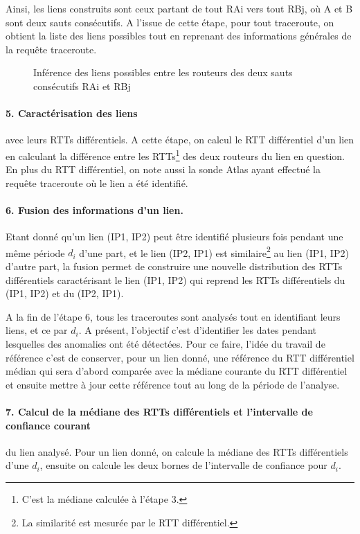 Ainsi, les liens  construits sont ceux partant de tout RAi vers tout RBj, où A et B sont deux sauts consécutifs. A l'issue de cette étape, pour tout traceroute, on obtient la liste des liens possibles tout en reprenant des informations générales de la requête traceroute.
\begin{figure}[H]
	\centering
	\captionsetup{justification=centering}
	
	\caption{Inférence des liens possibles entre les routeurs des deux sauts consécutifs RAi et RBj}
	\label{fig:link-inference}
\end{figure}
\paragraph{5. Caractérisation des liens} avec leurs RTTs différentiels. A cette étape, on calcul le RTT différentiel d'un lien en calculant la différence entre les RTTs\footnote{C'est la médiane calculée à l'étape 3.} des deux routeurs du lien en question. En plus du RTT différentiel, on note aussi la sonde Atlas ayant effectué la requête traceroute où le lien a été identifié. 

\paragraph{6. Fusion des informations d'un lien. } Etant donné qu'un lien (IP1, IP2) peut être identifié plusieurs fois pendant une même période $d_i$ d'une part, et le lien (IP2, IP1) est similaire\footnote{La similarité est mesurée par le RTT différentiel.} au lien  (IP1, IP2) d'autre part, la fusion permet de construire une nouvelle distribution des RTTs différentiels caractérisant le lien (IP1, IP2) qui reprend les RTTs différentiels du (IP1, IP2) et du (IP2, IP1).


A la fin de l'étape 6, tous les traceroutes sont analysés tout en identifiant leurs liens, et ce par $d_i$. A présent, l'objectif c'est d'identifier les dates pendant lesquelles des anomalies ont été détectées. Pour ce faire, l'idée du travail de référence c'est de conserver, pour un lien donné, une référence du RTT différentiel médian qui sera d'abord comparée avec la médiane courante du RTT différentiel et ensuite mettre à jour cette référence tout au long de la période de l'analyse.

  
  \paragraph{7. Calcul de la médiane des RTTs différentiels et   l'intervalle de confiance courant} du lien analysé. Pour un lien donné, on calcule la médiane des RTTs différentiels d'une $d_i$, ensuite on calcule les deux bornes de l'intervalle de confiance pour $d_i$.
  
